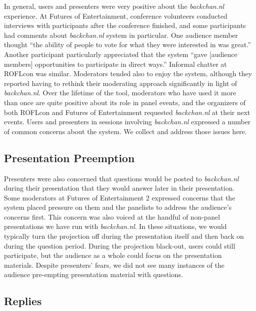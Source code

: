 In general, users and presenters were very positive about the \emph{backchan.nl} experience. At Futures of Entertainment, conference volunteers conducted interviews with participants after the conference finished, and some participants had comments about \emph{backchan.nl} system in particular. One audience member thought ``the ability of people to vote for what they were interested in was great.'' Another participant particularly appreciated that the system ``gave [audience members] opportunities to participate in direct ways.'' Informal chatter at ROFLcon was similar. Moderators tended also to enjoy the system, although they reported having to rethink their moderating approach significantly in light of \emph{backchan.nl}. Over the lifetime of the tool, moderators who have used it more than once are quite positive about its role in panel events, and the organizers of both ROFLcon and Futures of Entertainment requested \emph{backchan.nl} at their next events. 
Users and presenters in sessions involving \emph{backchan.nl} expressed a number of common concerns about the system. We collect and address those issues here.

\subsection{Presentation Preemption}
Presenters were also concerned that questions would be posted to \emph{backchan.nl} during their presentation that they would answer later in their presentation. Some moderators at Futures of Entertainment 2 expressed concerns that the system placed pressure on them and the panelists to address the audience's concerns first. This concern was also voiced at the handful of non-panel presentations we have run with \emph{backchan.nl}. In these situations, we would typically turn the projection off during the presentation itself and then back on during the question period. During the projection black-out, users could still participate, but the audience as a whole could focus on the presentation materials. Despite presenters' fears, we did not see many instances of the audience pre-empting presentation material with questions.


\subsection{Replies}

